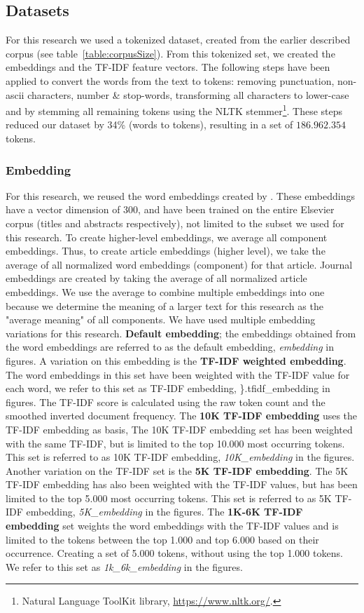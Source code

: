 \documentclass[../../paper.tex]{subfiles}
\begin{document}
\subsection{Datasets}
For this research we used a tokenized dataset, created from the earlier described corpus (see table~\ref{table:corpusSize}). From this tokenized set, we created the embeddings and the TF-IDF feature vectors. The following steps have been applied to convert the words from the text to tokens: removing punctuation, non-ascii characters, number \& stop-words, transforming all characters to lower-case and by stemming all remaining tokens using the NLTK stemmer\footnote{Natural Language ToolKit library, \url{https://www.nltk.org/}.}.
These steps reduced our dataset by 34\% (words to tokens), resulting in a set of $186.962.354$ tokens.
\subsubsection{Embedding}
For this research, we reused the word embeddings created by \citet{Truong2017Thesis}. These embeddings have a vector dimension of 300, and have been trained on the entire Elsevier corpus (titles and abstracts respectively), not limited to the subset we used for this research. To create higher-level embeddings, we average all component embeddings. Thus, to create article embeddings (higher level), we take the average of all normalized word embeddings (component) for that article. Journal embeddings are created by taking the average of all normalized article embeddings. We use the average to combine multiple embeddings into one because we determine the meaning of a larger text for this research as the "average meaning" of all components. We have used multiple embedding variations for this research. \textbf{Default embedding}; the embeddings  obtained from the word embeddings are referred to as the default embedding, \textit{embedding} in figures. A variation on this embedding is the \textbf{TF-IDF weighted embedding}. The word embeddings in this set have been weighted with the TF-IDF value for each word, we refer to this set as TF-IDF embedding, \}.{tfidf\_embedding} in figures. The TF-IDF score is calculated using the raw token count and the smoothed inverted document frequency. The \textbf{10K TF-IDF embedding} uses the TF-IDF embedding as basis, The 10K TF-IDF embedding set has been weighted with the same TF-IDF, but is limited to the top 10.000 most occurring tokens. This set is referred to as 10K TF-IDF embedding, \textit{10K\_embedding} in the figures. Another variation on the TF-IDF set is the \textbf{5K TF-IDF embedding}. The 5K TF-IDF embedding has also been weighted with the TF-IDF values, but has been limited to the top 5.000 most occurring tokens. This set is referred to as 5K TF-IDF embedding, \textit{5K\_embedding} in the figures. The \textbf{1K-6K TF-IDF embedding} set weights the word embeddings with the TF-IDF values and is limited to the tokens between the top 1.000 and top 6.000 based on their occurrence. Creating a set of 5.000 tokens, without using the top 1.000 tokens. We refer to this set as \textit{1k\_6k\_embedding} in the figures.
\end{document}
